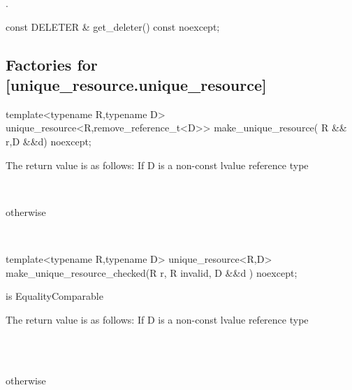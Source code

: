 \documentclass[ebook,11pt,article]{memoir}
\begin{document}
\pnum
\returns {}.

\begin{itemdecl}
const DELETER & get_deleter() const noexcept;
\end{itemdecl}

\pnum
\returns {}

\subsection {Factories for  [unique_resource.unique_resource]}
\begin{itemdecl}
template<typename R,typename D>
unique_resource<R,remove_reference_t<D>>
make_unique_resource( R && r,D &&d) noexcept;
\end{itemdecl}


\pnum
The return value is as follows: If D is a non-const lvalue reference type 

\pnum
\returns {}\\

\pnum
otherwise

\pnum
\returns {}\\





\begin{itemdecl}
template<typename R,typename D>
unique_resource<R,D>
make_unique_resource_checked(R r, R invalid, D &&d ) noexcept;
\end{itemdecl}

\pnum
\requires {} is EqualityComparable

\pnum
The return value is as follows: If D is a non-const lvalue reference type 

\pnum
\returns \\
\\

\pnum
otherwise

\pnum
\returns \\
    \\
\end{document}
